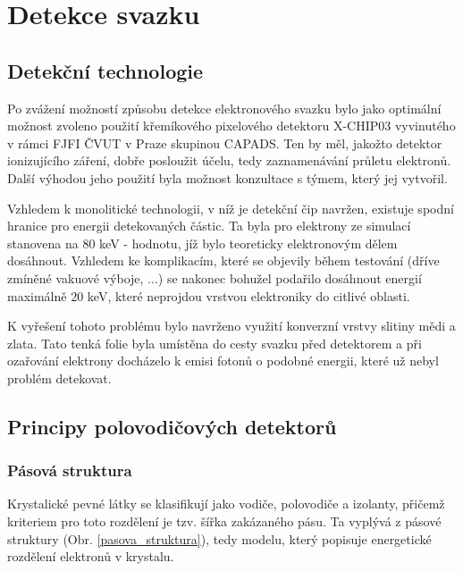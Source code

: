 \newcommand{\fig}[4]{ 
	\begin{figure}[!ht]
		\centering
		\texttt{[image: Figure/07/\#2.png]}
		\caption[#3]{#4}
		\label{#2}
	\end{figure}
}

\renewcommand{\figurename}{Obr.}
\newcommand{\figref}[1]{\figurename \hspace{1 pt} \ref{#1}}

\newpage \clearpage

\chapter{Detekce svazku}
\label{kapMatej}

\section{Detekční technologie}
Po zvážení možností způsobu detekce elektronového svazku bylo jako optimální možnost zvoleno použití křemíkového pixelového detektoru X-CHIP03 vyvinutého v rámci FJFI ČVUT v Praze skupinou CAPADS. Ten by měl, jakožto detektor ionizujícího záření, dobře posloužit účelu, tedy zaznamenávání průletu elektronů. Další výhodou jeho použití byla možnost konzultace s týmem, který jej vytvořil. 

Vzhledem k monolitické technologii, v níž je detekční čip navržen, existuje spodní hranice pro energii detekovaných částic. Ta byla pro elektrony ze simulací stanovena na 80 keV - hodnotu, jíž bylo teoreticky elektronovým dělem dosáhnout. Vzhledem ke komplikacím, které se objevily během testování (dříve zmíněné vakuové výboje, ...) se nakonec bohužel podařilo dosáhnout energií maximálně 20 keV, které neprojdou vrstvou elektroniky do citlivé oblasti.

K vyřešení tohoto problému bylo navrženo využití konverzní vrstvy slitiny mědi a zlata. Tato tenká folie byla umístěna do cesty svazku před detektorem a při ozařování elektrony docházelo k emisi fotonů o podobné energii, které už nebyl problém detekovat. 

\section{Principy polovodičových detektorů}
\subsection{Pásová struktura}
Krystalické pevné látky se klasifikují jako vodiče, polovodiče a izolanty, přičemž kriteriem pro toto rozdělení je tzv. šířka zakázaného pásu. Ta vyplývá z pásové struktury (\figref{pasova_struktura}), tedy modelu, který popisuje energetické rozdělení elektronů v krystalu. 

